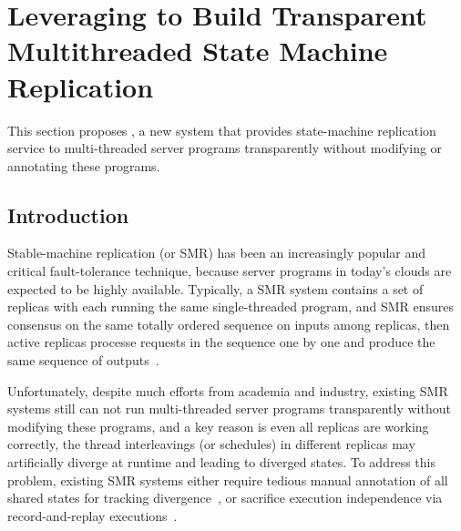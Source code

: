 \section{Leveraging \smt to Build Transparent Multithreaded State Machine Replication} \label{ch:rep}

This section proposes \msmr, a new system that provides 
state-machine replication service to multi-threaded server programs 
transparently without modifying or annotating these programs.
   
\subsection{Introduction} \label{sec:rep-intro}


Stable-machine replication (or SMR) has been an increasingly popular and critical fault-tolerance 
technique, because server programs in today's clouds are expected to be 
highly available. Typically, a SMR system contains a set of replicas with each 
running the same single-threaded program, and SMR ensures 
consensus on the same totally ordered sequence on inputs among replicas, then
active replicas processe requests in the sequence one by one and produce the same
sequence of outputs~\cite{paxos, pbft:osdi99, mencius:osdi08, saebft:sosp03}.

Unfortunately, despite much efforts from academia and industry, existing SMR systems 
still can not run multi-threaded server programs transparently without 
modifying these programs, and a key reason is even all replicas are working 
correctly, the thread interleavings (or schedules) in different replicas may 
artificially diverge at runtime and leading to diverged states. To address this 
problem, existing SMR systems either require tedious manual annotation of
all shared states for tracking divergence~\cite{eve:osdi12}, or sacrifice 
execution independence via record-and-replay executions~\cite{rex:eurosys14, 
vft:sosp95}.

